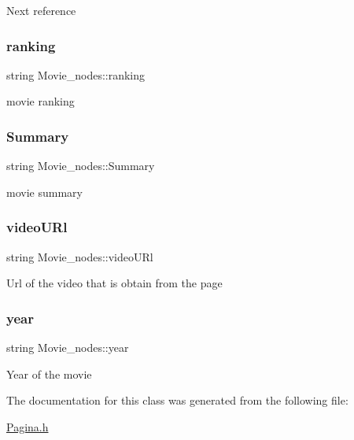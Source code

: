 Next reference \mbox{\label{classMovie__nodes_a973ce5054c9b339ff7524f321e536907}} 
\subsubsection{\texorpdfstring{ranking}{ranking}}
{\footnotesize\ttfamily string Movie\+\_\+nodes\+::ranking}

movie ranking \mbox{\label{classMovie__nodes_a750c539606db10507a051bb8015c7e9f}} 
\subsubsection{\texorpdfstring{Summary}{Summary}}
{\footnotesize\ttfamily string Movie\+\_\+nodes\+::\+Summary}

movie summary \mbox{\label{classMovie__nodes_afe4615779808359a974838d85ba3c70e}} 
\subsubsection{\texorpdfstring{video\+U\+Rl}{videoURl}}
{\footnotesize\ttfamily string Movie\+\_\+nodes\+::video\+U\+Rl}

Url of the video that is obtain from the page \mbox{\label{classMovie__nodes_a3f13e928ef69696af7b419bb16cd1f15}} 
\subsubsection{\texorpdfstring{year}{year}}
{\footnotesize\ttfamily string Movie\+\_\+nodes\+::year}

Year of the movie 

The documentation for this class was generated from the following file\+:\begin{DoxyCompactItemize}
\item 
\hyperlink{Pagina_8h}{Pagina.\+h}\end{DoxyCompactItemize}
